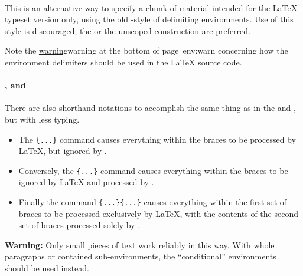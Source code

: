 %
\paragraph*{\label{endlatexonly}}
This is an alternative way to specify a chunk of material intended
for the \LaTeX{} typeset version only,
using the old \AmS-style of delimiting environments.
Use of this style is discouraged; 
the   or the unscoped 
construction are preferred.%

\smallskip\noindent
Note the \hyperref[page]{warning}{warning at the bottom of page~}{}{env:warn}
concerning how the environment delimiters should be used in the
\LaTeX{} source code.


%
%
%
\html{\\}%
\paragraph*{,  and \label{latexhtml}}
There are also shorthand notations to accomplish the same thing 
as in the   and  
, but with less typing.
\begin{itemize}
\item 
The \verb|{...}| command causes everything within the braces 
to be processed by \LaTeX, but ignored by \latextohtml.
\item  
Conversely, the \verb|{...}| command causes everything within the braces 
to be ignored by \LaTeX{} and processed by \latextohtml.  
\item  
Finally the command \verb|{...}{...}| causes everything 
within the first set of braces to be processed exclusively by \LaTeX, 
with the contents of the second set of braces processed solely by \latextohtml.%
\end{itemize}
\textbf{Warning: }
Only small pieces of text work reliably in this way. 
With whole paragraphs or contained sub-environments,
the ``conditional'' environments should be used instead.

%
%
%
